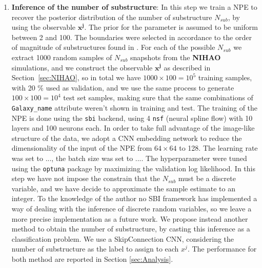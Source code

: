 \begin{enumerate}
    \item \textbf{Inference of the number of substructure}: In this step we train a NPE to recover the posterior distribution of the number of substructure $N_{sub}$, by using the observable \textbf{$\mathbf{x^j}$}. The prior for the parameter is assumed to be uniform between 2 and 100. The boundaries were selected in accordance to the order of magnitude of substructures found in \cite{deasonUnravellingMassSpectrum2023}. For each of the possible $N_{sub}$ we extract 1000 random samples of $N_{sub}$ snapshots from the \textbf{NIHAO} simulations, and we construct the observable \textbf{$\mathbf{x^j}$} as described in Section~\ref{sec:NIHAO}, so in total we have $1000 \times 100 = 10^5$ training samples, with 20 \% used as validation, and we use the same process to generate $100 \times 100 = 10^4$ test set samples, making sure that the same combinations of \texttt{Galaxy\_name} attribute weren't shown in training and test. The training of the NPE is done using the \texttt{sbi} backend, using 4 \texttt{nsf} (neural spline flow) with 10 layers and 100 neurons each. In order to take full advantage of the image-like structure of the data, we adopt a CNN embedding network to reduce the dimensionality of the input of the NPE from $64 \times 64$ to 128. The learning rate was set to ..., the batch size was set to .... The hyperparameter were tuned using the \texttt{optuna} package by maximizing the validation log likelihood. In this step we have not impose the constrain that the $N_{sub}$ must be a discrete variable, and we have decide to approximate the sample estimate to an integer. To the knowledge of the author no SBI framework has implemented a way of dealing with the inference of discrete random variables, so we leave a more precise implementation as a future work. We propose instead another method to obtain the number of substructure, by casting this inference as a classification problem. We use a SkipConnection CNN, considering the number of substructure as the label to assign to each $x^j$. The performance for both method are reported in Section \ref{sec:Analysis}.

\end{enumerate}
